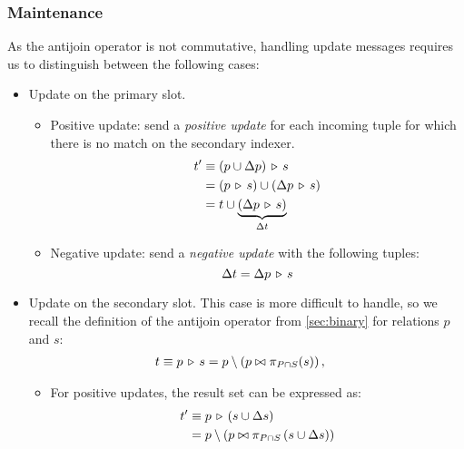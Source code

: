 \subsubsection{Maintenance}

As the antijoin operator is not commutative, handling update messages requires us to distinguish between the following cases:

\begin{itemize}
	\item Update on the primary slot.
	\begin{itemize}
		\item Positive update: send a \emph{positive update} for each incoming tuple for which there is no match on the secondary indexer.
		\begin{align*}
			t'       & \equiv \left(p \cup \Delta p\right) \, \triangleright \, s               \\
			         & = (p \, \triangleright \, s) \cup (\Delta p \, \triangleright \, s) \\
			         & = t \cup \underbrace{(\Delta p \, \triangleright \, s)}_{\Delta t}
		\end{align*}

		\item Negative update: send a \emph{negative update} with the following tuples:
		$$ \Delta t = \Delta p \, \triangleright \, s $$
	\end{itemize}

	\item Update on the secondary slot. This case is more difficult to handle, so we recall the definition of the antijoin operator from \autoref{sec:binary} for relations $p$ and $s$:
	\begin{align*}
		t & \equiv p \, \triangleright \, s = p \setminus \left(p \bowtie \pi_{P \cap S} (s)\right),
	\end{align*}





	\begin{itemize}
		\item For positive updates, the result set can be expressed as:
		\begin{align*}
			t'       & \equiv p \, \triangleright \, \left(s \cup \Delta s\right) \\
			         & = p \setminus \left( p \bowtie \pi_{P \cap S} \left(s \cup \Delta s\right) \right)
		\end{align*}


\end{itemize}
\end{itemize}
